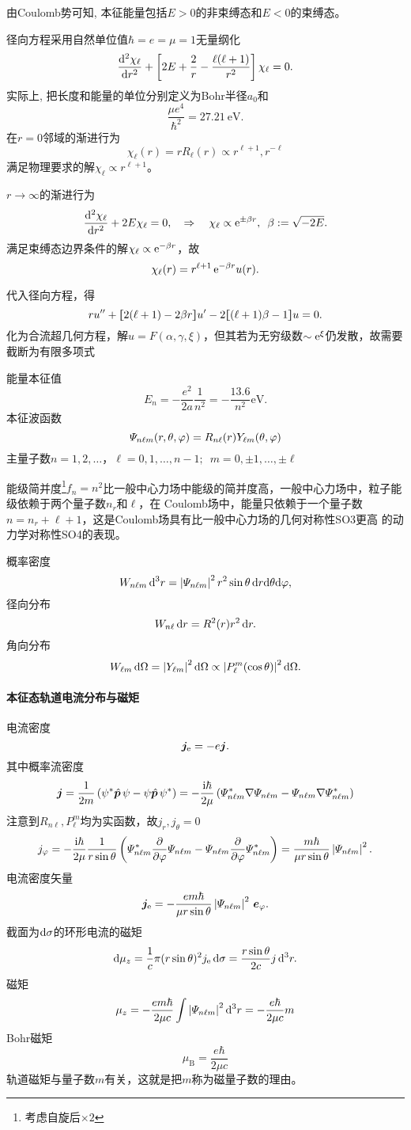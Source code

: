 由Coulomb势可知, 本征能量包括$E>0$的非束缚态和$E<0$的束缚态。

径向方程采用自然单位值$\hbar=e=\mu=1$无量纲化
\[\dv[2]{\chi_\ell}r+\fkh{2E+\frac2r-\frac{\ell(\ell+1)}{r^2}}\chi_\ell=0.\]
实际上, 把长度和能量的单位分别定义为Bohr半径$a_0$和
\[\frac{\mu e^4}{\hbar^2}=\SI{27.21}\eV.\]
在$r=0$邻域的渐进行为
\[\chi_\ell(r)=rR_\ell(r)\propto r^{\ell+1},r^{-\ell}\]
满足物理要求的解$\chi_\ell\propto r^{\ell+1}$。

$r\to\infty$的渐进行为
\[\dv[2]{\chi_\ell}r+2E\chi_\ell=0,\thus\chi_\ell\propto\e{\pm\beta r},\enspace \beta:=\sqrt{-2E}.\]
满足束缚态边界条件的解$\chi_\ell\propto\e{-\beta r}$，故
\[\chi_\ell(r)=r^{\ell+1}\e{-\beta r}u(r).\]

代入径向方程，得
\[ru''+\zkh{2(\ell+1)-2\beta r}u'-2\zkh{(\ell+1)\beta-1}u=0.\]
化为合流超几何方程，解$u=F(\alpha,\gamma,\xi)$，但其若为无穷级数$\sim\e{\xi}$仍发散，故需要截断为有限多项式

能量本征值 
\[E_n=-\frac{e^2}{2a}\frac1{n^2}=-\frac{13.6}{n^2}\si\eV.\]
本征波函数
\[\vp_{n\ell m}(r,\theta,\vf)=R_{n\ell}(r)Y_{\ell m}(\ct,\vf)\]
主量子数$n=1,2,\ldots$，$\ell=0,1,\ldots,n-1;\enspace m=0,\pm 1,\ldots,\pm\ell$

能级简并度\footnote{考虑自旋后$\times 2$}$f_n=n^2$比一般中心力场中能级的简并度高，一般中心力场中，粒子能级依赖于两个量子数$n_r$和$\ell$，在
Coulomb场中，能量只依赖于一个量子数$n=n_r+\ell+1$，这是Coulomb场具有比一般中心力场的几何对称性SO3更高
的动力学对称性SO4的表现。

概率密度
\[W_{n\ell m}\d^3r=\abs{\vp_{n\ell m}}^2r^2\sin\ct\d r\nd\ct\nd\vf,\]
径向分布
\[W_{n\ell}\d r=R^2(r)r^2\d r.\]
角向分布
\[W_{\ell m}\d\Omega=\abs{Y_{\ell m}}^2\d\Omega\propto\abs{P_\ell^m(\cos\theta)}^2\d\Omega.\]
\paragraph*{本征态轨道电流分布与磁矩}
电流密度
\[\bm j_\elc=-e\bm j.\]
其中概率流密度
\[\bm j=\frac1{2m}\kh{\psi\cj\qo p\psi-\psi\qo p\psi\cj}=-\frac{\i\hbar}{2\mu}\kh{\vp_{n\ell m}\cj\nabla\vp_{n\ell m}-\vp_{n\ell m}\nabla\vp_{n\ell m}\cj}\]
注意到$R_{n\ell},P_\ell^m$均为实函数，故$j_r,j_\theta=0$
\[j_\vf=-\frac{\i\hbar}{2\mu}\frac1{r\sin\ct}\kh{\vp_{n\ell m}\cj\pp\vf\vp_{n\ell m}-\vp_{n\ell m}\pp\vf\vp_{n\ell m}\cj}=\frac{m\hbar}{\mu r\sin\theta}\abs{\vp_{n\ell m}}^2.\]
电流密度矢量
\[\bm j_\elc=-\frac{em\hbar}{\mu r\sin\theta}\abs{\vp_{n\ell m}}^2\ibm e_\vf.\]
截面为$\d\sigma$的环形电流的磁矩
\[\d\mu_z=\frac1c\pi(r\sin\theta)^2j_\elc\d\sigma=\frac{r\sin\theta}{2c}j\d^3r.\]
磁矩
\[\mu_z=-\frac{em\hbar}{2\mu c}\int\abs{\vp_{n\ell m}}^2\d^3r=-\frac{e\hbar}{2\mu c}m\]
Bohr磁矩
\[\mu_\mathrm B=\frac{e\hbar}{2\mu c}\]
轨道磁矩与量子数$m$有关，这就是把$m$称为磁量子数的理由。
